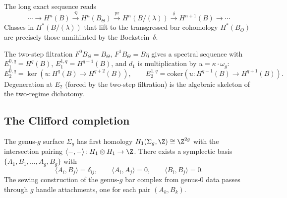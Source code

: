 \begin{corollary}
\label{cor:g9-bockstein}
The long exact sequence reads
\begin{equation}\label{eq:g9-bockstein-les}
\cdots \to
H^n(B) \xrightarrow{\cdot\eta}
H^n(B_\Theta) \xrightarrow{\mathrm{pr}}
H^n(B/(\lambda)) \xrightarrow{\delta}
H^{n+1}(B) \to \cdots
\end{equation}
Classes in $H^*(B/(\lambda))$ that lift to the transgressed bar
cohomology $H^*(B_\Theta)$ are precisely those annihilated
by the Bockstein~$\delta$.
\end{corollary}

\begin{remark}
\label{rem:g9-eta-spectral}
The two-step filtration $F^0 B_\Theta = B_\Theta$,
$F^1 B_\Theta = B\eta$ gives a spectral sequence with
$E_1^{0,q} = H^q(B)$, $E_1^{1,q} = H^{q-1}(B)$, and
$d_1$ is multiplication by $u = \kappa \cdot \omega_g$:
\[
E_2^{0,q} = \ker(u\colon H^q(B) \to H^{q+2}(B)),
\qquad
E_2^{1,q} = \mathrm{coker}(u\colon H^{q-1}(B) \to H^{q+1}(B)).
\]
Degeneration at $E_2$ (forced by the two-step filtration) is the
algebraic skeleton of the two-regime dichotomy.
\end{remark}

%
%

\subsection{The Clifford completion}
\label{subsec:clifford-completion}

The genus-$g$ surface $\Sigma_g$ has first homology
$H_1(\Sigma_g, \Z) \cong \Z^{2g}$ with the intersection pairing
$\langle -, - \rangle\colon H_1 \otimes H_1 \to \Z$.
There exists a symplectic basis $\{A_1, B_1, \ldots, A_g, B_g\}$ with
\begin{equation}\label{eq:g9-intersection}
\langle A_i, B_j \rangle = \delta_{ij},
\qquad
\langle A_i, A_j \rangle = 0,
\qquad
\langle B_i, B_j \rangle = 0.
\end{equation}
The sewing construction of the genus-$g$ bar complex from genus-$0$
data passes through $g$ handle attachments, one for each pair
$(A_k, B_k)$.

